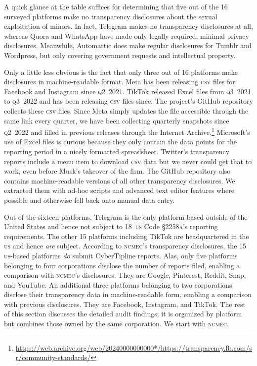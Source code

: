 \documentclass[nonacm,screen]{acmart}
\newcommand\V[1]{\textsc{\MakeLowercase{#1}}}
\begin{document}
\begin{itemize}
{A quick glance at the table suffices for determining that five out of the 16
surveyed platforms make no transparency disclosures about the sexual
exploitation of minors. In fact, Telegram makes no transparency disclosures at
all, whereas Quora and WhatsApp have made only legally required, minimal privacy
disclosures. Meanwhile, Automattic does make regular disclosures for Tumblr and
Wordpress, but only covering government requests and intellectual property.

Only a little less obvious is the fact that only three out of 16 platforms make
disclosures in machine-readable format. Meta has been releasing \V{CSV} files
for Facebook and Instagram since \V{Q2}~2021. TikTok released Excel files from
\V{Q3}~2021 to \V{Q3}~2022 and has been releasing \V{CSV} files since. The
project's GitHub repository collects these \V{CSV} files. Since Meta simply
updates the file accessible through the same link every quarter, we have been
collecting quarterly snapshots since \V{Q2}~2022 and filled in previous releases
through the Internet
Archive.\footnote{\url{https://web.archive.org/web/20240000000000*/https://transparency.fb.com/sr/community-standards/}}
Microsoft's use of Excel files is curious because they only contain the data
points for the reporting period in a nicely formatted spreadsheet. Twitter's
transparency reports include a menu item to download \V{CSV} data but we never
could get that to work, even before Musk's takeover of the firm. The GitHub
repository also contains machine-readable versions of all other transparency
disclosures. We extracted them with ad-hoc scripts and advanced text editor
features where possible and otherwise fell back onto manual data entry.

Out of the sixteen platforms, Telegram is the only platform based outside of the
United States and hence not subject to 18~\V{US} Code \V{\S2258A}'s reporting
requirements. The other 15 platforms including TikTok are headquartered in the
\V{US} and hence \emph{are} subject. According to \V{NCMEC}'s transparency
disclosures, the 15 \V{US}-based platforms \emph{do} submit CyberTipline
reports. Alas, only five platforms belonging to four corporations disclose the
number of reports filed, enabling a comparison with \V{NCMEC}'s disclosures.
They are Google, Pinterest, Reddit, Snap, and YouTube. An additional three
platforms belonging to two corporations disclose their transparency data in
machine-readable form, enabling a comparison with previous disclosures. They are
Facebook, Instagram, and TikTok. The rest of this section discusses the detailed
audit findings; it is organized by platform but combines those owned by the same
corporation. We start with \V{NCMEC}.


}
\end{itemize}
\end{document}
